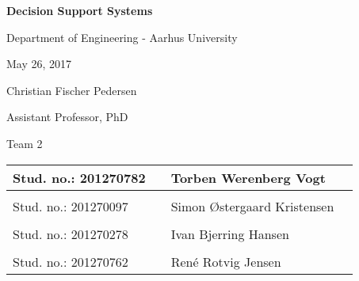 
\centerline{\Huge\bfseries\color{ThemeColor} Decision Support Systems}

\vspace{5em}
\centerline{\large\bfseries\color{BlackColor}}
\vspace{0.5em}
\centerline{\large\color{BlackColor}Department of Engineering - Aarhus University}

\vspace{0.5em}
\centerline{\large\color{BlackColor} May 26, 2017}

\vspace{5em}
\centerline{\large\color{BlackColor} Christian Fischer Pedersen}
\vspace{0.5em}
\centerline{\large\color{BlackColor} Assistant Professor, PhD}


\vspace{25em}

\begin{center}
	\centerline{\large\color{BlackColor} Team 2}
	\vspace{5em}
   \begin{tabular}{ l p{3cm} l l }
    Stud. no.: 201270782 && Torben Werenberg Vogt & \\\hline
	& & \\
	Stud. no.: 201270097 && Simon Østergaard Kristensen & \\\hline
	& & \\
	Stud. no.: 201270278 && Ivan Bjerring Hansen & \\\hline
	& & \\
   Stud. no.: 201270762 && René Rotvig Jensen & \\\hline
   \end{tabular}
\end{center}
\thispagestyle{empty} %
\restoregeometry

